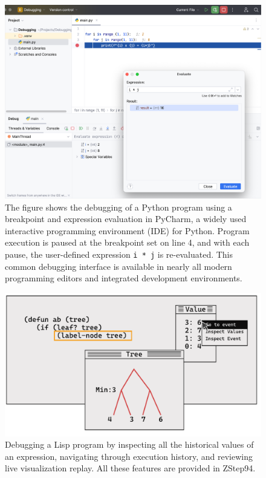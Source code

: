 \begin{figure}[ht]
  \centering
  \includegraphics[width=\linewidth]{BreakPoint}
  \caption[Debugging of a Python program using a breakpoint and expression evaluation in PyCharm]{
    \label{fig:breakpoint}
    The figure shows the debugging of a Python program using a breakpoint and expression evaluation in PyCharm, a widely used interactive programming environment (IDE) for Python. Program execution is paused at the breakpoint set on line 4, and with each pause, the user-defined expression \texttt{i * j} is re-evaluated. This common debugging interface is available in nearly all modern programming editors and integrated development environments.
    }
\end{figure}


\begin{figure}[ht]
  \centering
  \includegraphics[width=\linewidth]{ZStep94}
  \caption[Debugging a Lisp program by inspecting all the historical values of an expression in ZStep94]{
    \label{fig:zstep94}
    Debugging a Lisp program by inspecting all the historical values of an expression, navigating through execution history, and reviewing live visualization replay.  All these features are provided in ZStep94.
    }
\end{figure}



